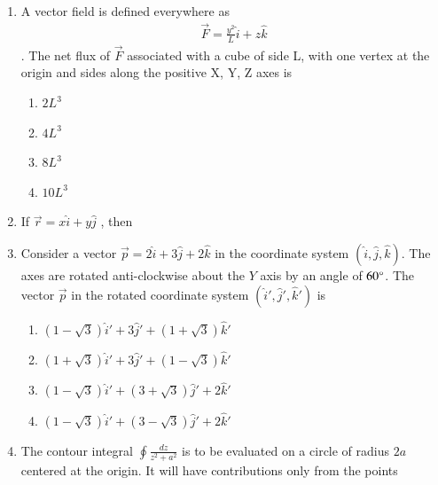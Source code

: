 \documentclass[journal,12pt,onecolumn]{IEEEtran}
\begin{document}
\begin{enumerate}[itemsep = 1em]
\item A vector field is defined everywhere as 
\begin{align*}
 \vec{F} = \frac{y^2}{L}\hat{i} + z\hat{k}   
\end{align*}.  The net flux of $\vec{F}$ associated with a cube of side L, with one vertex at the origin and sides along the positive X, Y, Z axes is

\hfill{}

\begin{multicols}{4}
\begin{enumerate}
    \item $2L^{3}$
    \item $4L^{3}$
    \item $8L^{3}$
    \item $10L^{3}$
    \end{enumerate}
\end{multicols}


\item If $\vec{r} = x\hat{i} + y\hat{j}$ , then

\hfill{}

\item Consider a vector $\vec{p} = 2\hat{i} + 3\hat{j} + 2\hat{k}$ in the coordinate system $(\hat{i},\hat{j},\hat{k})$. The axes are rotated anti-clockwise about the $Y$ axis by an angle of $60\degree$. The vector $\vec{p}$ in the rotated coordinate system $(\hat{i}',\hat{j}',\hat{k}')$ is

\hfill{}

\begin{enumerate}

\item $(1-\sqrt{3})\hat{i}' + 3\hat{j}' + (1+\sqrt{3})\hat{k}'$
\item $(1+\sqrt{3})\hat{i}' + 3\hat{j}' + (1-\sqrt{3})\hat{k}'$
\item $(1-\sqrt{3})\hat{i}' + (3+\sqrt{3})\hat{j}' + 2\hat{k}'$
\item $(1-\sqrt{3})\hat{i}' + (3-\sqrt{3})\hat{j}' + 2\hat{k}'$

\end{enumerate}

\vspace{2em}


\item The contour integral $\oint \frac{dz}{z^2+a^2}$ is to be evaluated on a circle of radius $2a$ centered at the origin. It will have contributions only from the points


\end{enumerate}
\end{document}
